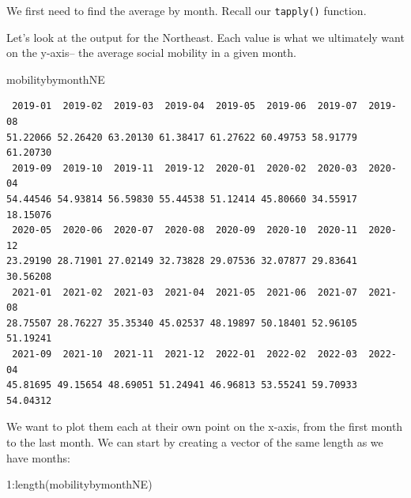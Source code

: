 \documentclass[
  letterpaper,
  DIV=11,
  numbers=noendperiod]{scrreprt}
\newenvironment{Shaded}{\begin{snugshade}}{\end{snugshade}}
\newcommand{\AttributeTok}[1]{\textcolor[rgb]{0.40,0.45,0.13}{#1}}
\newcommand{\DecValTok}[1]{\textcolor[rgb]{0.68,0.00,0.00}{#1}}
\newcommand{\FunctionTok}[1]{\textcolor[rgb]{0.28,0.35,0.67}{#1}}
\newcommand{\NormalTok}[1]{\textcolor[rgb]{0.00,0.23,0.31}{#1}}
\newcommand{\OtherTok}[1]{\textcolor[rgb]{0.00,0.23,0.31}{#1}}
\newcommand{\SpecialCharTok}[1]{\textcolor[rgb]{0.37,0.37,0.37}{#1}}
\begin{document}
We first need to find the average by month. Recall our \texttt{tapply()}
function.

\begin{Shaded}
\end{Shaded}

Let's look at the output for the Northeast. Each value is what we
ultimately want on the y-axis-- the average social mobility in a given
month.

\begin{Shaded}
\begin{Highlighting}[]
\NormalTok{mobilitybymonthNE}
\end{Highlighting}
\end{Shaded}

\begin{verbatim}
 2019-01  2019-02  2019-03  2019-04  2019-05  2019-06  2019-07  2019-08 
51.22066 52.26420 63.20130 61.38417 61.27622 60.49753 58.91779 61.20730 
 2019-09  2019-10  2019-11  2019-12  2020-01  2020-02  2020-03  2020-04 
54.44546 54.93814 56.59830 55.44538 51.12414 45.80660 34.55917 18.15076 
 2020-05  2020-06  2020-07  2020-08  2020-09  2020-10  2020-11  2020-12 
23.29190 28.71901 27.02149 32.73828 29.07536 32.07877 29.83641 30.56208 
 2021-01  2021-02  2021-03  2021-04  2021-05  2021-06  2021-07  2021-08 
28.75507 28.76227 35.35340 45.02537 48.19897 50.18401 52.96105 51.19241 
 2021-09  2021-10  2021-11  2021-12  2022-01  2022-02  2022-03  2022-04 
45.81695 49.15654 48.69051 51.24941 46.96813 53.55241 59.70933 54.04312 
\end{verbatim}

We want to plot them each at their own point on the x-axis, from the
first month to the last month. We can start by creating a vector of the
same length as we have months:

\begin{Shaded}
\begin{Highlighting}[]
\DecValTok{1}\SpecialCharTok{:}\FunctionTok{length}\NormalTok{(mobilitybymonthNE)}
\end{Highlighting}
\end{Shaded}
\end{document}
